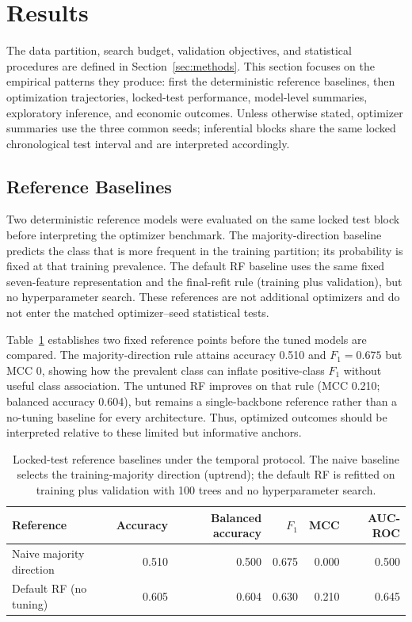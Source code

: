 \section{Results}\label{sec:results}

The data partition, search budget, validation objectives, and statistical procedures are defined in Section~\ref{sec:methods}. This section focuses on the empirical patterns they produce: first the deterministic reference baselines, then optimization trajectories, locked-test performance, model-level summaries, exploratory inference, and economic outcomes. Unless otherwise stated, optimizer summaries use the three common seeds; inferential blocks share the same locked chronological test interval and are interpreted accordingly.

\subsection{Reference Baselines}

Two deterministic reference models were evaluated on the same locked test block before interpreting the optimizer benchmark. The majority-direction baseline predicts the class that is more frequent in the training partition; its probability is fixed at that training prevalence. The default RF baseline uses the same fixed seven-feature representation and the final-refit rule (training plus validation), but no hyperparameter search. These references are not additional optimizers and do not enter the matched optimizer--seed statistical tests.

Table~\ref{tab:reference_baselines} establishes two fixed reference points before the tuned models are compared. The majority-direction rule attains accuracy 0.510 and $F_1=0.675$ but MCC 0, showing how the prevalent class can inflate positive-class $F_1$ without useful class association. The untuned RF improves on that rule (MCC 0.210; balanced accuracy 0.604), but remains a single-backbone reference rather than a no-tuning baseline for every architecture. Thus, optimized outcomes should be interpreted relative to these limited but informative anchors.

\begin{table}[htbp]
\centering
\caption{Locked-test reference baselines under the temporal protocol. The naive baseline selects the training-majority direction (uptrend); the default RF is refitted on training plus validation with 100 trees and no hyperparameter search.}
\label{tab:reference_baselines}
\footnotesize
\begin{tabular}{lrrrrr}\toprule
\textbf{Reference} & \textbf{Accuracy} & \textbf{Balanced accuracy} & \textbf{$F_1$} & \textbf{MCC} & \textbf{AUC-ROC}\\\midrule
Naive majority direction & 0.510 & 0.500 & 0.675 & 0.000 & 0.500\\
Default RF (no tuning) & 0.605 & 0.604 & 0.630 & 0.210 & 0.645\\\bottomrule
\end{tabular}
\end{table}

